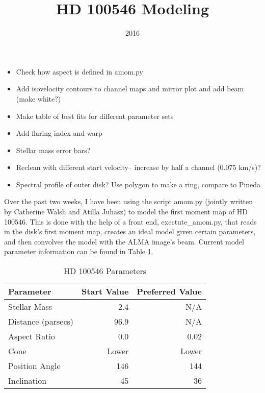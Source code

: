 \documentclass[a4paper]{tufte-handout}
\title{HD 100546 Modeling}
\date{2016}
\begin{document}
\maketitle


\begin{tasks}
    \begin{itemize}
    	\item Check how aspect is defined in amom.py
      \item Add isovelocity contours to channel maps and mirror plot and add beam (make white?)
      \item Make table of best fits for different parameter sets
      \item Add flaring index and warp
    \end{itemize}
\end{tasks}


\begin{maybe}
    \begin{itemize}
    	\item Stellar mass error bars?
      \item Reclean with different start velocity-- increase by half a channel (0.075 km/s)?
      \item Spectral profile of outer disk? Use polygon to make a ring, compare to Pineda
    \end{itemize}
\end{maybe}




Over the past two weeks, I have been using the script amom.py (jointly written by Catherine Walsh and Atilla Juhasz) to model the first moment map of HD 100546. This is done with the help of a front end, exectute\_amom.py, that reads in the disk's first moment map, creates an ideal model given certain parameters, and then convolves the model with the ALMA image's beam. Current model parameter information can be found in Table \ref{tab:parameters}.

\begin{table}[h]
\label{tab:parameters}
\centering
\caption{HD 100546 Parameters}
\begin{tabular}{lrr}
\toprule
Parameter 	&	Start Value &	 Preferred Value\\
\midrule
Stellar Mass &	2.4 &	N/A\\
Distance (parsecs)&	96.9 &	N/A\\
Aspect Ratio   &	0.0   &	 0.02\\
Cone           &	Lower &	 Lower\\
Position Angle &	146   &	 144\\
Inclination    &	45   &	 36 \\
\end{tabular}
\end{table}
\end{document}
